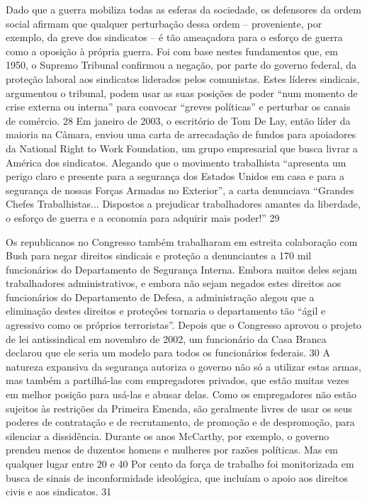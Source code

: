  
\par
 
Dado que a guerra mobiliza todas as esferas da sociedade, os defensores da ordem social afirmam que qualquer perturbação dessa ordem – proveniente, por exemplo, da greve dos sindicatos – é tão ameaçadora para o esforço de guerra como a oposição à própria guerra. Foi com base nestes fundamentos que, em 1950, o Supremo Tribunal confirmou a negação, por parte do governo federal, da proteção laboral aos sindicatos liderados pelos comunistas. Estes líderes sindicais, argumentou o tribunal, podem usar as suas posições de poder “num momento de crise externa ou interna” para convocar “greves políticas” e perturbar os canais de comércio.
 {\color{blue} 28}  
Em janeiro de 2003, o escritório de Tom De Lay, então líder da maioria na Câmara, enviou uma carta de arrecadação de fundos para apoiadores da National Right to Work Foundation, um grupo empresarial que busca livrar a América dos sindicatos. Alegando que o movimento trabalhista “apresenta um perigo claro e presente para a segurança dos Estados Unidos em casa e para a segurança de nossas Forças Armadas no Exterior”, a carta denunciava “Grandes Chefes Trabalhistas... Dispostos a prejudicar trabalhadores amantes da liberdade, o esforço de guerra e a economia para adquirir mais poder!”
 {\color{blue} 29}  

 
\par
 
Os republicanos no Congresso também trabalharam em estreita colaboração com Bush para negar direitos sindicais e proteção a denunciantes a 170 mil funcionários do Departamento de Segurança Interna. Embora muitos deles sejam trabalhadores administrativos, e embora não sejam negados estes direitos aos funcionários do Departamento de Defesa, a administração alegou que a eliminação destes direitos e proteções tornaria o departamento tão “ágil e agressivo como os próprios terroristas”. Depois que o Congresso aprovou o projeto de lei antissindical em novembro de 2002, um funcionário da Casa Branca declarou que ele seria um modelo para todos os funcionários federais.
 {\color{blue} 30}  
A natureza expansiva da segurança autoriza o governo não só a utilizar estas armas, mas também a partilhá-las com empregadores privados, que estão muitas vezes em melhor posição para usá-las e abusar delas. Como os empregadores não estão sujeitos às restrições da Primeira Emenda, são geralmente livres de usar os seus poderes de contratação e de recrutamento, de promoção e de despromoção, para silenciar a dissidência. Durante os anos McCarthy, por exemplo, o governo prendeu menos de duzentos homens e mulheres por razões políticas. Mas em qualquer lugar entre
 {\color{blue} 20}  
e
 {\color{blue} 40}  
Por cento da força de trabalho foi monitorizada em busca de sinais de inconformidade ideológica, que incluíam o apoio aos direitos civis e aos sindicatos.
 {\color{blue} 31}  

